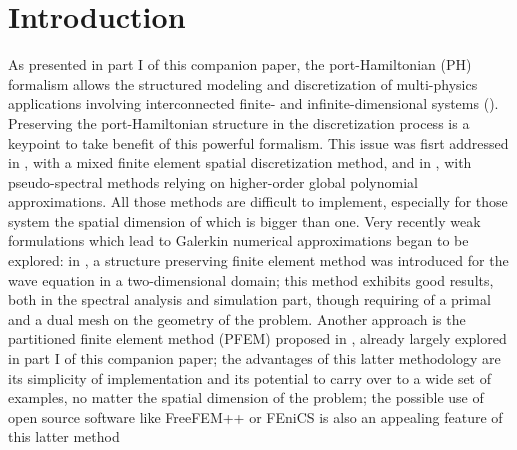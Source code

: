 \documentclass[preprint,12pt]{elsarticle}
\begin{document}
\section*{Introduction}
As presented in part I of this companion paper, the port-Hamiltonian (PH) formalism \cite{BookZwart, bookPHs, Villegas} allows the structured modeling and discretization of multi-physics applications involving interconnected finite- and infinite-dimensional systems (\cite{Cervera2007,ShaftIntInfinite,vanderShaftintFinInf}). Preserving the port-Hamiltonian structure in the discretization process is a keypoint to take benefit of this powerful formalism. This issue was fisrt addressed in \cite{Golo}, with a mixed finite element spatial discretization method, and in \cite{moulla:hal-01625008}, with pseudo-spectral methods relying on higher-order global polynomial approximations. All those methods are difficult to implement, especially for those system the spatial dimension of which is bigger than one. Very recently weak formulations which lead to Galerkin numerical approximations began to be explored: in \cite{WeakForm_Kot}, a structure preserving finite element method was introduced for the wave equation in a two-dimensional domain; this method exhibits good results, both in the spectral analysis and simulation part, though requiring of a primal and a dual mesh on the geometry of the problem. Another approach is the partitioned finite element method (PFEM) proposed in \cite{LHMNLCFlavio2018}, already largely explored in part I of this companion paper; the advantages of this latter methodology are its simplicity of implementation and its potential to carry over to a wide set of examples, no matter the spatial dimension of the problem; the possible use of open source software like FreeFEM++ or FEniCS is also an appealing feature of this latter method  \\
\end{document}
